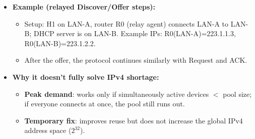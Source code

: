 \begin{itemize}
\begin{itemize}
		\item Relay inserts \textbf{giaddr} (gateway IP) so server knows the client subnet and selects an address accordingly.
		\item Relay forwards Discover/Request and returns Offer/ACK back to the client (continue with DORA).
	\end{itemize}
	\item \textbf{Example (relayed Discover/Offer steps):}
	\begin{itemize}
		\item Setup: H1 on LAN-A, router R0 (relay agent) connects LAN-A to LAN-B; DHCP server is on LAN-B. Example IPs: R0(LAN-A)=223.1.1.3, R0(LAN-B)=223.1.2.2.
	\end{itemize}

	\noindent\hspace*{-\leftmargin}

	\begin{itemize}
		\item After the offer, the protocol continues similarly with Request and ACK.
	\end{itemize}
	\item \textbf{Why it doesn't fully solve IPv4 shortage:}
	\begin{itemize}
		\item \textbf{Peak demand}: works only if simultaneously active devices $<$ pool size; if everyone connects at once, the pool still runs out.
		\item \textbf{Temporary fix}: improves reuse but does not increase the global IPv4 address space ($2^{32}$).
	\end{itemize}
\end{itemize}